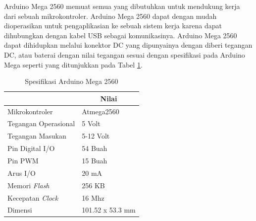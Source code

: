 Arduino Mega 2560 memuat semua yang dibutuhkan untuk mendukung kerja dari sebuah mikrokontroler. Arduino Mega 2560 dapat dengan mudah dioperasikan untuk pengaplikasian ke sebuah sistem kerja karena dapat dihubungkan dengan kabel USB sebagai komunikasinya. Arduino Mega 2560 dapat dihidupkan melalui konektor DC yang dipunyainya dengan diberi tegangan DC, atau baterai dengan nilai tegangan sesuai dengan spesifikasi pada Arduino Mega seperti yang ditunjukkan pada Tabel \ref{tbl.arduinomega}\cite{arduino2}.
\begin{table}[H]
	\centering
	\caption{ Spesifikasi Arduino Mega 2560 }
	\label{tbl.arduinomega}
	\begin{tabular}{|l|l|}
		\hline
		\rowcolor[HTML]{9B9B9B} 
		\multicolumn{1}{|c|}{\cellcolor[HTML]{9B9B9B}Keterangan} & \multicolumn{1}{c|}{\cellcolor[HTML]{9B9B9B}Nilai} \\ \hline
		Mikrokontroler                                           & Atmega2560                                         \\ \hline
		Tegangan Operasional                                     & 5 Volt                                             \\ \hline
		Tegangan Masukan                                         & 5-12 Volt                                          \\ \hline
		Pin Digital I/O                                          & 54 Buah                                            \\ \hline
		Pin PWM                                                  & 15 Buah                                            \\ \hline
		Arus I/O                                                 & 20 mA                                              \\ \hline
		Memori \textit{Flash}                                             & 256 KB                                             \\ \hline
		Kecepatan \textit{Clock}                                          & 16 Mhz                                             \\ \hline
		Dimensi                                                  & 101.52 x 53.3 mm                                   \\ \hline
	\end{tabular}
\end{table}
